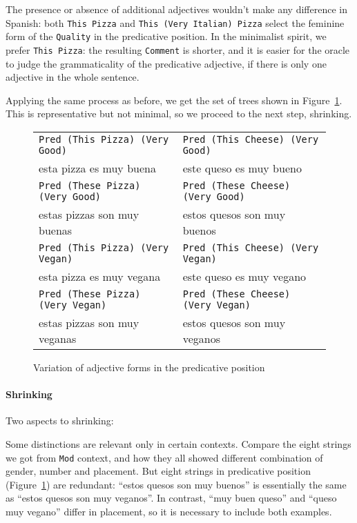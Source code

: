 \documentclass[11pt]{article}
\def\t#1{\texttt{#1}}
\begin{document}
The presence or absence of additional adjectives wouldn't make any
difference in Spanish: both \t{This Pizza} and \t{This (Very Italian)
 Pizza} select the feminine form of the \t{Quality} in the predicative
position. In the minimalist spirit, we prefer \t{This Pizza}: the
resulting \t{Comment} is shorter, and it is easier for the oracle to
judge the grammaticality of the predicative adjective, if there is
only one adjective in the whole sentence. 

Applying the same process as before, we get the set of trees shown in 
Figure~\ref{fig:goodCheese}. This is representative but not minimal,
so we proceed to the next step, shrinking.

\begin{figure}
\centering
\begin{tabular}{| l | l |}
\hline
\t{Pred (This Pizza) (Very Good)}   & \t{Pred (This Cheese) (Very Good)} \\ 
esta pizza es muy buena             & este queso es muy bueno \\ \hline
\t{Pred (These Pizza) (Very Good)}  & \t{Pred (These Cheese) (Very Good)} \\ 
estas pizzas son muy buenas         & estos quesos son muy buenos \\ \hline
\t{Pred (This Pizza) (Very Vegan)}   & \t{Pred (This Cheese) (Very Vegan)} \\ 
esta pizza es muy vegana             & este queso es muy vegano \\ \hline
\t{Pred (These Pizza) (Very Vegan)}  & \t{Pred (These Cheese) (Very Vegan)} \\ 
estas pizzas son muy veganas         & estos quesos son muy veganos \\ \hline
\end{tabular}
\caption{Variation of adjective forms in the predicative position}
\label{fig:goodCheese}
\end{figure}


\paragraph{Shrinking}

Two aspects to shrinking:

Some distinctions are relevant only in certain
contexts. Compare the eight strings we got from \t{Mod} context, and
how they all showed different combination of gender, number and
placement. But eight strings in predicative position (Figure~\ref{fig:goodCheese})
are redundant: ``estos quesos son muy buenos'' is essentially the same
as ``estos quesos son muy veganos''. In contrast, ``muy buen queso''
and ``queso muy vegano'' differ in placement, so it is necessary to
include both examples.
\end{document}
